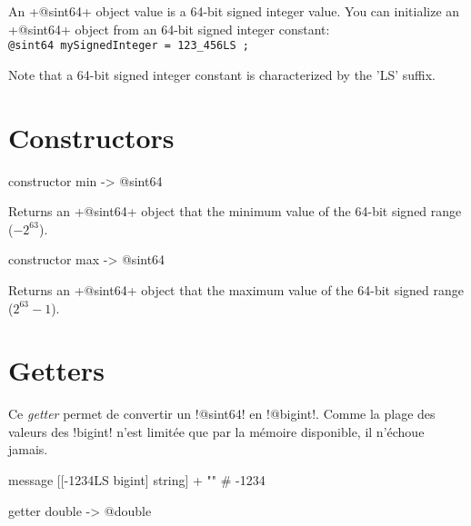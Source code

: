 

An \ggs+@sint64+ object value is a 64-bit signed integer value. You can initialize an \ggs+@sint64+ object from an 64-bit signed integer constant:\\

\texttt{@sint64 mySignedInteger = 123\_456LS ;}

Note that a 64-bit signed integer constant is characterized by the 'LS' suffix.

\section{Constructors}



\begin{galgas}
constructor min -> @sint64
\end{galgas}

Returns an \ggs+@sint64+ object that the minimum value of the 64-bit signed range ($-2^{63}$).






\begin{galgas}
constructor max -> @sint64
\end{galgas}

Returns an \ggs+@sint64+ object that the maximum value of the 64-bit signed range ($2^{63}-1$).


\section{Getters}



Ce \emph{getter} permet de convertir un \ggs!@sint64! en \ggs!@bigint!. Comme la plage des valeurs des \ggs!bigint! n'est limitée que par la mémoire disponible, il n'échoue jamais.

\begin{galgas}
  message [[-1234LS bigint] string] + "\n" # -1234
\end{galgas}




\begin{galgas}
getter double -> @double
\end{galgas}

